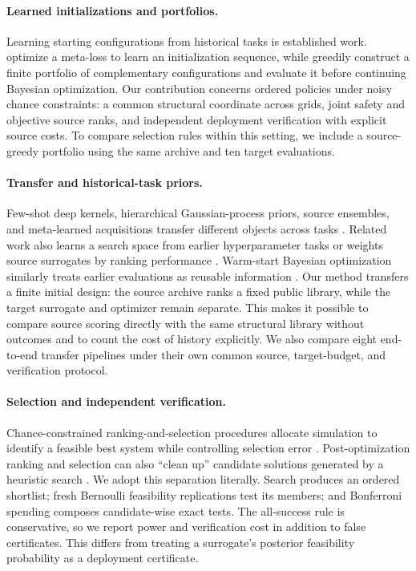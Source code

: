 \paragraph{Learned initializations and portfolios.}
Learning starting configurations from historical tasks is established work.
\citet{WistubaEtAl2015} optimize a meta-loss to learn an initialization
sequence, while \citet{FeurerEtAl2022} greedily construct a finite portfolio
of complementary configurations and evaluate it before continuing Bayesian
optimization.  Our contribution concerns ordered policies under noisy chance
constraints: a common structural coordinate across grids, joint safety and
objective source ranks, and independent deployment verification with explicit
source costs.  To compare selection rules within this setting, we include a
source-greedy portfolio using the same archive and ten target evaluations.

\paragraph{Transfer and historical-task priors.}
Few-shot deep kernels, hierarchical Gaussian-process priors, source ensembles,
and meta-learned acquisitions transfer different objects across tasks
\citep{WistubaGrabocka2021,RothfussEtAl2021,RothfussEtAl2021FPACOH,RothfussEtAl2023,
WangEtAl2024HyperBO,TighineanuEtAl2022,VolppEtAl2020,PanEtAl2024}.
Related work also learns a search space from earlier hyperparameter tasks
\citep{PerroneEtAl2019} or weights source surrogates by ranking performance
\citep{FeurerEtAl2018}.  Warm-start Bayesian optimization similarly treats
earlier evaluations as reusable information \citep{PoloczekWangFrazier2016}.
Our method transfers a finite initial design: the source archive ranks a fixed
public library, while the target surrogate and optimizer remain separate.  This makes
it possible to compare source scoring directly with the same structural
library without outcomes and to count the cost of history explicitly.  We
also compare eight end-to-end transfer pipelines under their own common
source, target-budget, and verification protocol.

\paragraph{Selection and independent verification.}
Chance-constrained ranking-and-selection procedures allocate simulation to
identify a feasible best system while controlling selection error
\citep{HongLuoNelson2015}.  Post-optimization ranking and selection can also
``clean up'' candidate solutions generated by a heuristic search
\citep{BoeselNelsonKim2003}.  We adopt this separation literally.  Search
produces an ordered shortlist; fresh Bernoulli feasibility replications test
its members; and Bonferroni spending composes candidate-wise exact tests.  The
all-success rule is conservative, so we report power and verification cost in
addition to false certificates.  This differs from treating a surrogate's
posterior feasibility probability as a deployment certificate.


